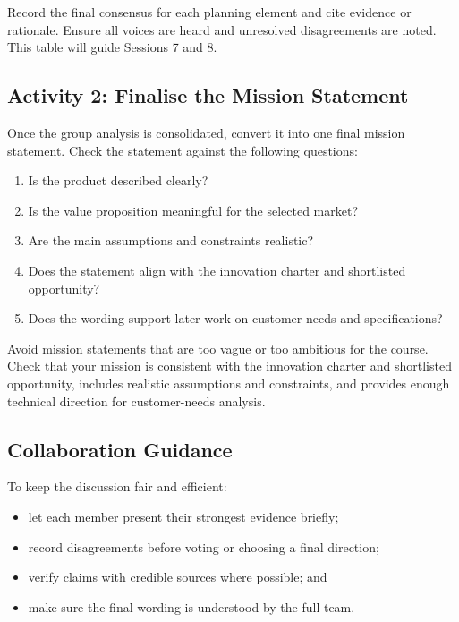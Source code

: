 \begin{tcolorbox}[title=Checkpoint]
Record the final consensus for each planning element and cite evidence or rationale. Ensure all voices are heard and unresolved disagreements are noted. This table will guide Sessions 7 and 8.
\end{tcolorbox}

\subsection{Activity 2: Finalise the Mission Statement}

Once the group analysis is consolidated, convert it into one final mission statement. Check the statement against the following questions:
\begin{enumerate}
    \item Is the product described clearly?
    \item Is the value proposition meaningful for the selected market?
    \item Are the main assumptions and constraints realistic?
    \item Does the statement align with the innovation charter and shortlisted opportunity?
    \item Does the wording support later work on customer needs and specifications?
\end{enumerate}

\begin{tcolorbox}[title=Common Mistakes]
Avoid mission statements that are too vague or too ambitious for the course. Check that your mission is consistent with the innovation charter and shortlisted opportunity, includes realistic assumptions and constraints, and provides enough technical direction for customer-needs analysis.
\end{tcolorbox}

\subsection{Collaboration Guidance}

To keep the discussion fair and efficient:
\begin{itemize}
    \item let each member present their strongest evidence briefly;
    \item record disagreements before voting or choosing a final direction;
    \item verify claims with credible sources where possible; and
    \item make sure the final wording is understood by the full team.
\end{itemize}

